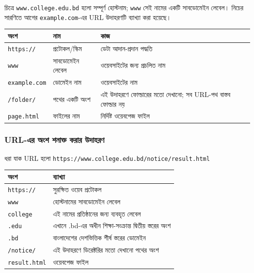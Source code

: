 চিত্রে \texttt{www.college.edu.bd} হলো সম্পূর্ণ হোস্টনাম; \texttt{www} সেই নামের একটি সাবডোমেইন লেবেল। নিচের সারণিতে আগের \texttt{example.com}-এর URL উদাহরণটি ব্যাখ্যা করা হয়েছে।

\begin{center}
\begin{tabular}{|p{}|p{}|p{}|}
\hline
\textbf{অংশ} & \textbf{নাম} & \textbf{কাজ} \\
\hline
\texttt{https://} & প্রটোকল/স্কিম & ডেটা আদান-প্রদান পদ্ধতি \\
\hline
\texttt{www} & সাবডোমেইন লেবেল & ওয়েবসাইটের জন্য প্রচলিত নাম \\
\hline
\texttt{example.com} & ডোমেইন নাম & ওয়েবসাইটের নাম \\
\hline
\texttt{/folder/} & পথের একটি অংশ & এই উদাহরণে ফোল্ডারের মতো দেখানো; সব URL-পথ বাস্তব ফোল্ডার নয় \\
\hline
\texttt{page.html} & ফাইলের নাম & নির্দিষ্ট ওয়েবপেজ ফাইল \\
\hline
\end{tabular}
\end{center}

\subsubsection{URL-এর অংশ শনাক্ত করার উদাহরণ}

ধরা যাক URL হলো \texttt{https://www.college.edu.bd/notice/result.html}

\begin{center}
\begin{tabular}{|p{}|p{}|}
\hline
\textbf{অংশ} & \textbf{ব্যাখ্যা} \\
\hline
\texttt{https://} & সুরক্ষিত ওয়েব প্রটোকল \\
\hline
\texttt{www} & হোস্টনামের সাবডোমেইন লেবেল \\
\hline
\texttt{college} & এই নামের প্রতিষ্ঠানের জন্য ব্যবহৃত লেবেল \\
\hline
\texttt{.edu} & এখানে .bd-এর অধীন শিক্ষা-সংক্রান্ত দ্বিতীয় স্তরের অংশ \\
\hline
\texttt{.bd} & বাংলাদেশের দেশভিত্তিক শীর্ষ স্তরের ডোমেইন \\
\hline
\texttt{/notice/} & এই উদাহরণে ডিরেক্টরির মতো দেখানো পথের অংশ \\
\hline
\texttt{result.html} & ওয়েবপেজ ফাইল \\
\hline
\end{tabular}
\end{center}

